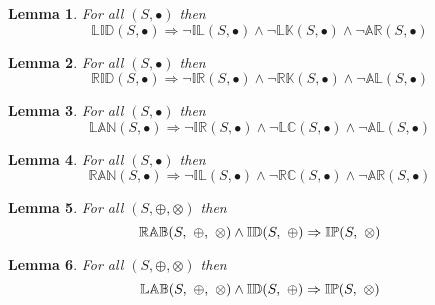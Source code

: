 \documentclass[10pt]{report}
\newcommand{\propname}[1]{{\mathbb{#1}}}
\newtheorem{lemma}{Lemma}
\begin{document}
\begin{lemma} \label{lem:lid_implies_n_il_lk_ar}
For all $(S, \bullet)$ then
\begin{equation*}
\propname{LID}(S, \bullet) \Rightarrow \neg \propname{IL}(S, \bullet) \wedge \neg \propname{LK}(S, \bullet) \wedge \neg \propname{AR}(S, \bullet)
\end{equation*}
\end{lemma}

\begin{lemma} \label{lem:rid_implies_n_ir_rk_al}
For all $(S, \bullet)$ then
\begin{equation*}
\propname{RID}(S, \bullet) \Rightarrow \neg \propname{IR}(S, \bullet) \wedge \neg \propname{RK}(S, \bullet) \wedge \neg \propname{AL}(S, \bullet)
\end{equation*}
\end{lemma}

\begin{lemma} \label{lem:lan_implies_n_ir_lc_al}
For all $(S, \bullet)$ then
\begin{equation*}
\propname{LAN}(S, \bullet) \Rightarrow \neg \propname{IR}(S, \bullet) \wedge \neg \propname{LC}(S, \bullet) \wedge \neg \propname{AL}(S, \bullet)
\end{equation*}
\end{lemma}

\begin{lemma} \label{lem:ran_implies_n_il_rc_ar}
For all $(S, \bullet)$ then
\begin{equation*}
\propname{RAN}(S, \bullet) \Rightarrow \neg \propname{IL}(S, \bullet) \wedge \neg \propname{RC}(S, \bullet) \wedge \neg \propname{AR}(S, \bullet)
\end{equation*}
\end{lemma}

\begin{lemma} \label{lem:rab_id_implies_ip}
For all $(S, \oplus, \otimes)$ then
\begin{equation*}
\propname{RAB}(S,\ \oplus,\ \otimes) \wedge \propname{ID}(S,\ \oplus) \Rightarrow \propname{IP}(S,\ \otimes)\\
\end{equation*}
\end{lemma}

\begin{lemma} \label{lem:lab_id_implies_ip}
For all $(S, \oplus, \otimes)$ then
\begin{equation*}
\propname{LAB}(S,\ \oplus,\ \otimes) \wedge \propname{ID}(S,\ \oplus) \Rightarrow \propname{IP}(S,\ \otimes)\\
\end{equation*}
\end{lemma}
\end{document}
